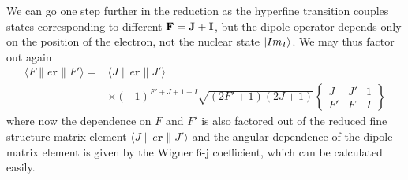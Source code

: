     We can go one step further in the reduction as the hyperfine transition
    couples states corresponding to different $\bf{F} = \bf{J} + \bf{I}$, but
    the dipole operator depends only on the position of the electron, not the
    nuclear state $\Ket{I m_I}$. We may thus factor out again
    \begin{align}
      \langle F  \| e \mathbf{r} \| F' \rangle =
      &\langle J  \| e \mathbf{r} \| J' \rangle \nonumber \\
      &\times (-1)^{F' + J + 1 + I}
      \sqrt{(2F' + 1)(2J + 1)}
            \begin{Bmatrix}
        J & J' & 1 \\
        F' & F & I 
      \end{Bmatrix}
      \label{eqn:red_tdme}
    \end{align}
    where now the dependence on $F$ and $F'$ is also factored out of the reduced
    fine structure matrix element $\langle J  \| e \mathbf{r} \| J' \rangle$ and
    the angular dependence of the dipole matrix element is given by the Wigner
    6-j coefficient, which can be calculated easily.

